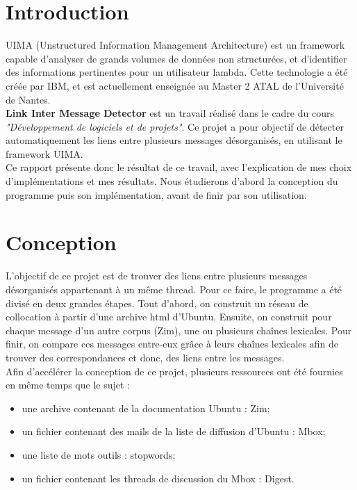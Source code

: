\documentclass[a4paper]{article}
\begin{document}
	



	\tableofcontents
	\newpage

	\section*{Introduction}
	
	UIMA (Unstructured Information Management Architecture) est un framework  capable d'analyser de grands volumes de données non structurées, et d'identifier des informations pertinentes pour un utilisateur lambda. Cette technologie a été créée par IBM, et est actuellement enseignée au Master 2 ATAL de l'Université de Nantes.\\

	\textbf{Link Inter Message Detector} est un travail réalisé dans le cadre du cours \textit{"Développement de logiciels et de projets"}. Ce projet a pour objectif de détecter automatiquement les liens entre plusieurs messages désorganisés, en utilisant le framework UIMA.\\

	Ce rapport présente donc le résultat de ce travail, avec l'explication de mes choix d'implémentations et mes résultats. Nous étudierons d'abord la conception du programme puis son implémentation, avant de finir par son utilisation.


	
	\section{Conception}
	
	L'objectif de ce projet est de trouver des liens entre plusieurs messages désorganisés appartenant à un même thread. Pour ce faire, le programme a été divisé en deux grandes étapes. Tout d'abord, on construit un réseau de collocation à partir d'une archive html d'Ubuntu. Ensuite, on construit pour chaque message d'un autre corpus (Zim), une ou plusieurs chaînes lexicales. Pour finir, on compare ces messages entre-eux grâce à leurs chaînes lexicales afin de trouver des correspondances et donc, des liens entre les messages.\\
	
	Afin d'accélérer la conception de ce projet, plusieurs ressources ont été fournies en même temps que le sujet :
\begin{itemize}
	\item une archive contenant de la documentation Ubuntu : Zim;
	\item un fichier contenant des mails de la liste de diffusion d'Ubuntu : Mbox; 
	\item une liste de mots outils : stopwords;
	\item un fichier contenant les threads de discussion du Mbox : Digest.
\end{itemize}
\end{document}
